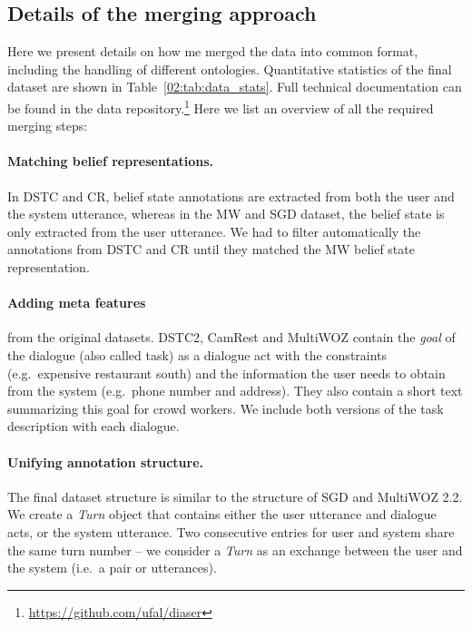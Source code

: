 \subsection{Details of the merging approach}
Here we present details on how me merged the data into common format, including the handling of different ontologies.
Quantitative statistics of the final dataset are shown in Table~\ref{02:tab:data_stats}.
Full technical documentation can be found in the data repository.\footnote{\url{https://github.com/ufal/diaser}}
Here we list an overview of all the required merging steps:

\paragraph{Matching belief representations.} In DSTC and CR, belief state annotations are extracted from both the user and the system utterance, whereas in the MW and SGD dataset, the belief state is only extracted from the user utterance. We had to filter automatically the annotations from DSTC and CR until they matched the MW belief state representation. 
    
\paragraph{Adding meta features} from the original datasets. DSTC2, CamRest and MultiWOZ contain the \emph{goal} of the dialogue (also called task) as a dialogue act with the constraints (e.g.\ expensive restaurant south) and the information the user needs to obtain from the system (e.g.\ phone number and address). They also contain a short text summarizing this goal for crowd workers. We include both versions of the task description with each dialogue.
    
\paragraph{Unifying annotation structure.} The final dataset structure is similar to the structure of SGD and MultiWOZ 2.2. We create a \textit{Turn} object that contains either the user utterance and dialogue acts, or the system utterance. Two consecutive entries for user and system share the same turn number -- we consider a \textit{Turn} as an exchange between the user and the system (i.e.\ a pair or utterances). 

